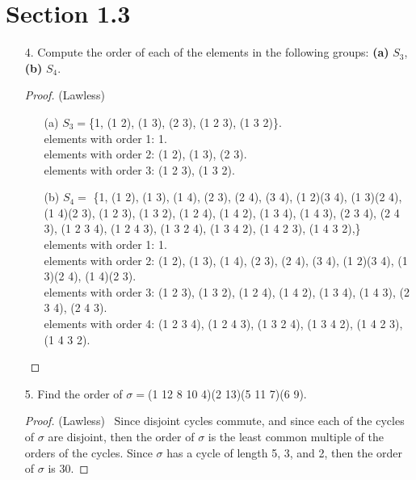 \documentclass[10pt]{article}
\begin{document}
\section*{Section 1.3}


\begin{itemize}

\item[4.] Compute the order of each of the elements in the following groups: \textbf{(a)} $S_3$, \textbf{(b)} $S_4$.

\begin{proof} (Lawless)
\begin{itemize}

\item[(a)] $S_3 = $\{1, (1 2), (1 3), (2 3), (1 2 3), (1 3 2)\}. \\
elements with order 1: 1. \\
elements with order 2: (1 2), (1 3), (2 3). \\
elements with order 3: (1 2 3), (1 3 2). \\

\item[(b)] $S_4 =$ \{1, (1 2), (1 3), (1 4), (2 3), (2 4), (3 4), (1 2)(3 4), (1 3)(2 4), (1 4)(2 3), (1 2 3), (1 3 2), (1 2 4), (1 4 2), (1 3 4), (1 4 3), (2 3 4), (2 4 3), (1 2 3 4), (1 2 4 3), (1 3 2 4), (1 3 4 2), (1 4 2 3), (1 4 3 2),\} \\
elements with order 1: 1. \\
elements with order 2: (1 2), (1 3), (1 4), (2 3), (2 4), (3 4), (1 2)(3 4), (1 3)(2 4), (1 4)(2 3). \\
elements with order 3: (1 2 3), (1 3 2), (1 2 4), (1 4 2), (1 3 4), (1 4 3), (2 3 4), (2 4 3). \\
elements with order 4: (1 2 3 4), (1 2 4 3), (1 3 2 4), (1 3 4 2), (1 4 2 3), (1 4 3 2).
\end{itemize}
\end{proof}

\item[5.] Find the order of $\sigma = $(1 12 8 10 4)(2 13)(5 11 7)(6 9).

\begin{proof}(Lawless) \ Since disjoint cycles commute, and since each of the cycles of $\sigma$ are disjoint, then the order of $\sigma$ is the least common multiple of the orders of the cycles. Since $\sigma$ has a cycle of length 5, 3, and 2, then the order of $\sigma$ is 30.
\end{proof}





\end{itemize}
\end{document}
